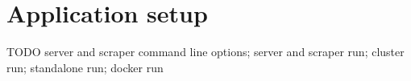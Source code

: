 \chapter{Application setup}\label{appendix:setup}

TODO server and scraper command line options; server and scraper run; cluster
run; standalone run; docker run
